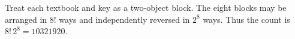 Treat each textbook and key as a two-object block. The eight blocks may be arranged in $8!$ ways and independently reversed in $2^8$ ways. Thus the count is $\boxed{8!\,2^8=10321920}$.

